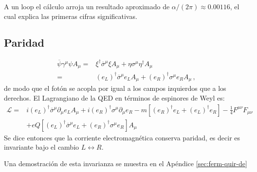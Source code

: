A un loop el cálculo arroja un resultado aproximado de $\alpha/(2\pi)\approx 0.00116$, el cual explica las primeras cifras significativas.
\subsection{Paridad}
\begin{frame}
\begin{align}
  \overline{\psi}\gamma^{\mu}\psi A_{\mu}=&
\xi^{\dagger}\overline{\sigma}^{\mu}\xi A_{\mu}+\eta\sigma^{\mu}\eta^{\dagger} A_{\mu}\nonumber\\
=&(e_L)^{\dagger}\overline{\sigma}^{\mu}e_L A_{\mu}+(e_R)^{\dagger}\sigma^{\mu}e_{R} A_{\mu}\,,
\end{align}
de modo que el fotón se acopla por igual a los campos izquierdos que a los derechos. El Lagrangiano de la QED en términos de espinores de Weyl es:
\begin{align}
  \mathcal{L}=&i(e_L)^{\dagger}\overline{\sigma}^{\mu}\partial_{\mu}e_L A_{\mu}+i(e_R)^{\dagger}\sigma^{\mu}\partial_{\mu}e_{R}
-m \left[ \left( e_R \right)^\dagger e_L+\left( e_L \right)^{\dagger}e_R \right] -\tfrac{1}{4}F^{\mu\nu}F_{\mu\nu}\nonumber\\
   &+eQ \left[(e_L)^{\dagger}\overline{\sigma}^{\mu}e_L+(e_R)^{\dagger}\sigma^{\mu}e_{R}  \right] A_{\mu}
\end{align}
Se dice entonces que la corriente  electromagnética conserva paridad, es decir es invariante bajo el cambio $L\leftrightarrow R$.
\end{frame}
Una demostración de esta invarianza se muestra en el Apéndice \ref{sec:ferm-quir-de}

